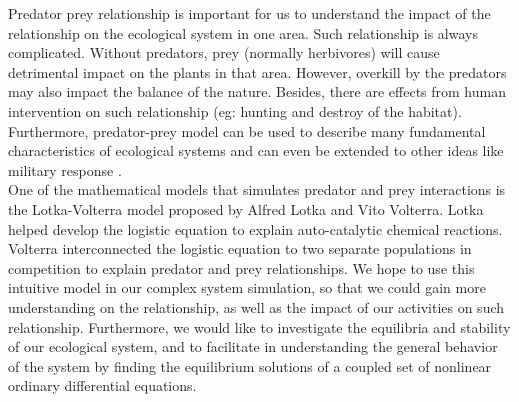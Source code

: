 \documentclass{article}
\begin{document}
\begin{normalsize}
		Predator prey relationship is important for us to understand the impact of the relationship on the ecological system in one area. Such relationship is always complicated. Without predators, prey (normally herbivores) will cause detrimental impact on the plants in that area. However, overkill by the predators may also impact the balance of the nature. Besides, there are effects from human intervention on such relationship (eg: hunting and destroy of the habitat). Furthermore, predator-prey model can be used to describe many fundamental characteristics of ecological systems and can even be extended to other ideas like military response \cite{derrik}.\\
		
		One of the mathematical models that simulates predator and prey interactions is the Lotka-Volterra model proposed by Alfred Lotka and Vito Volterra. Lotka helped develop the logistic equation to explain auto-catalytic chemical reactions. Volterra interconnected the logistic equation to two separate populations in competition to explain predator and prey relationships. We hope to use this intuitive model in our complex system simulation, so that we could gain more understanding on the relationship, as well as the impact of our activities on such relationship. Furthermore, we would like to investigate the equilibria and stability of our ecological system, and to facilitate in understanding the general behavior of the system by finding the equilibrium solutions of a coupled set of nonlinear ordinary differential equations.\cite{tung_2007_topics}\cite{a2018_alfred}

\end{normalsize}
\end{document}
